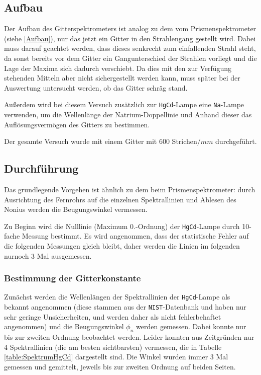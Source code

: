 \documentclass[a4paper, 11pt]{article}
\begin{document}
\subsection{Aufbau}
Der Aufbau des Gitterspektrometers ist analog zu dem vom Prismenspektrometer (siehe \ref{Aufbau}), nur das jetzt ein Gitter in den Strahlengang gestellt wird. Dabei muss darauf geachtet werden, dass dieses senkrecht zum einfallenden Strahl steht, da sonst bereits vor dem Gitter ein Gangunterschied der Strahlen vorliegt und die Lage der Maxima sich dadurch verschiebt. Da dies mit den zur Verfügung stehenden Mitteln aber nicht sichergestellt werden kann, muss später bei der Auswertung untersucht werden, ob das Gitter schräg stand.

Außerdem wird bei diesem Versuch zusätzlich zur \texttt{HgCd}-Lampe eine \texttt{Na}-Lampe verwenden, um die Wellenlänge der Natrium-Doppellinie und Anhand dieser das Auflösungsvermögen des Gitters zu bestimmen.

Der gesamte Versuch wurde mit einem Gitter mit 600 Strichen$/mm$ durchgeführt.


\subsection{Durchführung}
Das grundlegende Vorgehen ist ähnlich zu dem beim Prismenspektrometer: durch Ausrichtung des Fernrohrs auf die einzelnen Spektrallinien und Ablesen des Nonius werden die Beugungswinkel vermessen.

Zu Beginn wird die Nulllinie (Maximum 0.-Ordnung) der \texttt{HgCd}-Lampe durch 10-fache Messung bestimmt. Es wird angenommen, dass der statistische Fehler auf die folgenden Messungen gleich bleibt, daher werden die Linien im folgenden nurnoch 3 Mal ausgemessen.

\subsubsection{Bestimmung der Gitterkonstante}
Zunächst werden die Wellenlängen der Spektrallinien der \texttt{HgCd}-Lampe als bekannt angenommen (diese stammen aus der \texttt{NIST}-Datenbank und haben nur sehr geringe Unsicherheiten, und werden daher als nicht fehlerbehaftet angenommen) und die Beugungswinkel $\phi_n$ werden gemessen. Dabei konnte nur bis zur zweiten Ordnung beobachtet werden. Leider konnten aus Zeitgründen nur 4 Spektrallinien (die am besten sichtbarsten) vermessen, die in Tabelle \ref{table:SpektrumHgCd} dargestellt sind. Die Winkel wurden immer 3 Mal gemessen und gemittelt, jeweils bis zur zweiten Ordnung auf beiden Seiten.
\end{document}
